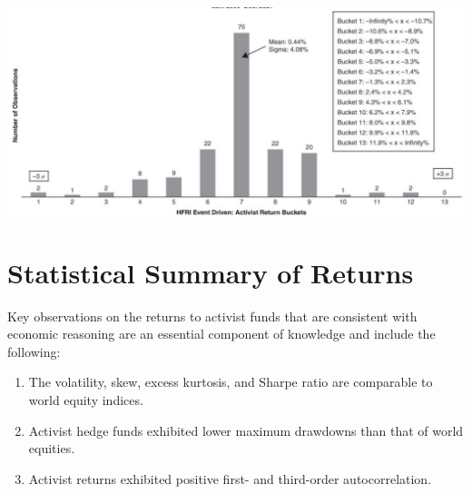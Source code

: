 \documentclass[11pt]{article}
\begin{document}
\begin{center}
\includegraphics[max width=\textwidth]{2024_04_09_7a731eb4be7055a19322g-7}
\end{center}

\section*{Statistical Summary of Returns}
Key observations on the returns to activist funds that are consistent with economic reasoning are an essential component of knowledge and include the following:

\begin{enumerate}
  \item The volatility, skew, excess kurtosis, and Sharpe ratio are comparable to world equity indices.

  \item Activist hedge funds exhibited lower maximum drawdowns than that of world equities.

  \item Activist returns exhibited positive first- and third-order autocorrelation.

\end{enumerate}
\end{document}
